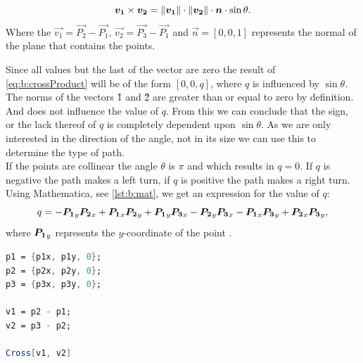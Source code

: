 \begin{equation}\label{eq:b:crossProduct}
	\boldsymbol{v_1} \times \boldsymbol{v_2} = 
	\lVert\boldsymbol{v_1}\rVert \cdot \lVert\boldsymbol{v_2}\rVert \cdot \boldsymbol{n} \cdot \sin \theta.
\end{equation}
Where the $\vec{v_1} = \vec{P_2} - \vec{P_1}$, $\vec{v_2} = \vec{P_3} - \vec{P_1}$ and $\vec{n} = [0, 0, 1]$ represents the normal of the plane that contains the points. 

Since all values but the last of the vector  are zero the result of \eqref{eq:b:crossProduct} will be of the form $[0, 0, q]$, where $q$ is influenced by $\sin \theta$. The norms of the vectors \v{1} and \v{2} are greater than or equal to zero by definition. And does not influence the value of $q$. From this we can conclude that the sign, or the lack thereof of $q$ is completely dependent upon $\sin \theta$. As we are only interested in the direction of the angle, not in its size we can use this to determine the type of path.\\

If the points are collinear the angle $\theta$ is $\pi$ and which results in $q = 0$. If $q$ is negative the path makes a left turn, if $q$ is positive the path makes a right turn.\\

Using Mathematica, see \autoref{lst:b:mat}, we get an expression for the value of $q$:
\begin{equation}\label{eq:b:q}
	q = -\boldsymbol{P_1}_y \boldsymbol{P_2}_x + \boldsymbol{P_1}_x \boldsymbol{P_2}_y + \boldsymbol{P_1}_y \boldsymbol{P_3}_x - \boldsymbol{P_2}_y \boldsymbol{P_3}_x - \boldsymbol{P_1}_x \boldsymbol{P_3}_y + \boldsymbol{P_2}_x \boldsymbol{P_3}_y,
\end{equation}
where $\boldsymbol{P_1}_y$ represents the $y$-coordinate of the point .

\begin{lstlisting}[float, language=Mathematica, label={lst:b:mat}, caption={Mathematica code used to compute the value of $q$.}]
p1 = {p1x, p1y, 0};
p2 = {p2x, p2y, 0};
p3 = {p3x, p3y, 0};

v1 = p2 - p1;
v2 = p3 - p2;

Cross[v1, v2]	
\end{lstlisting}


